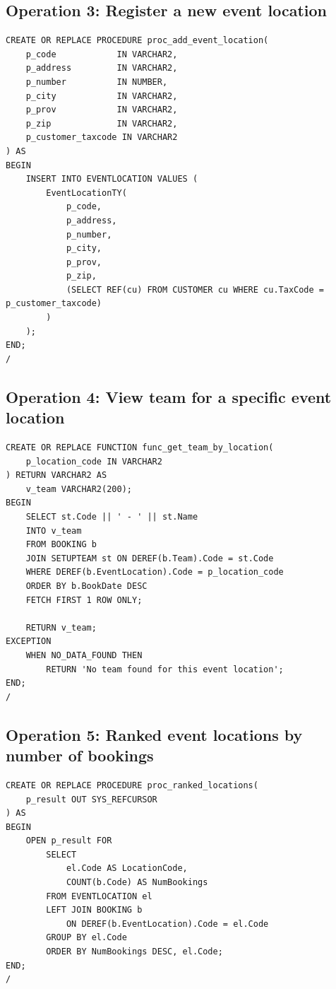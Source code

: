 \subsection*{Operation 3: Register a new event location}

\begin{lstlisting}
CREATE OR REPLACE PROCEDURE proc_add_event_location(
    p_code            IN VARCHAR2,
    p_address         IN VARCHAR2,
    p_number          IN NUMBER,
    p_city            IN VARCHAR2,
    p_prov            IN VARCHAR2,
    p_zip             IN VARCHAR2,
    p_customer_taxcode IN VARCHAR2
) AS
BEGIN
    INSERT INTO EVENTLOCATION VALUES (
        EventLocationTY(
            p_code,
            p_address,
            p_number,
            p_city,
            p_prov,
            p_zip,
            (SELECT REF(cu) FROM CUSTOMER cu WHERE cu.TaxCode = p_customer_taxcode)
        )
    );
END;
/
\end{lstlisting}

\subsection*{Operation 4: View team for a specific event location}

\begin{lstlisting}
CREATE OR REPLACE FUNCTION func_get_team_by_location(
    p_location_code IN VARCHAR2
) RETURN VARCHAR2 AS
    v_team VARCHAR2(200);
BEGIN
    SELECT st.Code || ' - ' || st.Name
    INTO v_team
    FROM BOOKING b
    JOIN SETUPTEAM st ON DEREF(b.Team).Code = st.Code
    WHERE DEREF(b.EventLocation).Code = p_location_code
    ORDER BY b.BookDate DESC
    FETCH FIRST 1 ROW ONLY;

    RETURN v_team;
EXCEPTION
    WHEN NO_DATA_FOUND THEN
        RETURN 'No team found for this event location';
END;
/
\end{lstlisting}

\subsection*{Operation 5: Ranked event locations by number of bookings}

\begin{lstlisting}
CREATE OR REPLACE PROCEDURE proc_ranked_locations(
    p_result OUT SYS_REFCURSOR
) AS
BEGIN
    OPEN p_result FOR
        SELECT
            el.Code AS LocationCode,
            COUNT(b.Code) AS NumBookings
        FROM EVENTLOCATION el
        LEFT JOIN BOOKING b
            ON DEREF(b.EventLocation).Code = el.Code
        GROUP BY el.Code
        ORDER BY NumBookings DESC, el.Code;
END;
/
\end{lstlisting}






